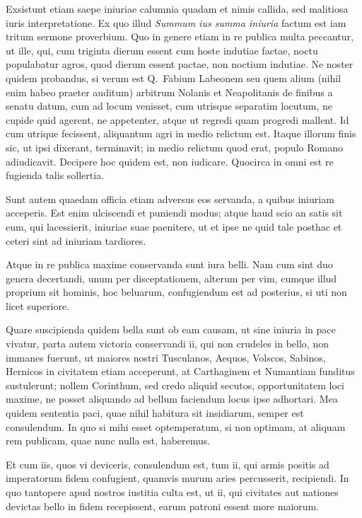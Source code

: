  

 Exsistunt etiam saepe iniuriae calumnia quadam et nimis callida, sed malitiosa iuris interpretatione. Ex quo illud \textit{Summum ius summa iniuria} factum est iam tritum sermone proverbium. Quo in genere etiam in re publica multa peccantur, ut ille, qui, cum triginta dierum essent cum hoste indutiae factae, noctu populabatur agros, quod dierum essent pactae, non noctium indutiae. Ne noster quidem probandus, si verum est Q.~Fabium Labeonem seu quem alium (nihil enim habeo praeter auditum) arbitrum Nolanis et Neapolitanis de finibus a senatu datum, cum ad locum venisset, cum utrisque separatim locutum, ne cupide quid agerent, ne appetenter, atque ut regredi quam progredi mallent. Id cum utrique fecissent, aliquantum agri in medio relictum est. Itaque illorum finis sic, ut ipsi dixerant, terminavit; in medio relictum quod erat, populo Romano adiudicavit. Decipere hoc quidem est, non iudicare. Quocirca in omni est re fugienda talis sollertia.


Sunt autem quaedam officia etiam adversus eos servanda, a quibus iniuriam acceperis. Est enim ulciscendi et puniendi modus; atque haud scio an satis sit eum, qui lacessierit, iniuriae suae paenitere, ut et ipse ne quid tale posthac et ceteri sint ad iniuriam tardiores.

 

 Atque in re publica maxime conservanda sunt iura belli. Nam cum sint duo genera decertandi, unum per disceptationem, alterum per vim, cumque illud proprium sit hominis, hoc beluarum, confugiendum est ad posterius, si uti non licet superiore. 

 Quare suscipienda quidem bella sunt ob eam causam, ut sine iniuria in pace vivatur, parta autem victoria conservandi ii, qui non crudeles in bello, non immanes fuerunt, ut maiores nostri Tusculanos, Aequos, Volscos, Sabinos, Hernicos in civitatem etiam acceperunt, at Carthaginem et Numantiam funditus sustulerunt; nollem Corinthum, sed credo aliquid secutos, opportunitatem loci maxime, ne posset aliquando ad bellum faciendum locus ipse adhortari. Mea quidem sententia paci, quae nihil habitura sit insidiarum, semper est consulendum. In quo si mihi esset optemperatum, si non optimam, at aliquam rem publicam, quae nunc nulla est, haberemus.

Et cum iis, quos vi deviceris, consulendum est, tum ii, qui armis positis ad imperatorum fidem confugient, quamvis murum aries percusserit, recipiendi. In quo tantopere apud nostros iustitia culta est, ut ii, qui civitates aut nationes devictas bello in fidem recepissent, earum patroni essent more maiorum.

